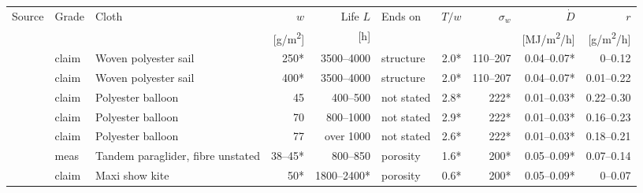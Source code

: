 \begin{tabular}{@{}lllrrlrrrr@{}}
\toprule
Source & Grade & Cloth & $w$ & Life $L$ & Ends on & $T/w$ & $\sigma_w$ & $\dot D$ & $r$ \\
 & & & [g/m\textsuperscript{2}] & [h] & & & & [MJ/m\textsuperscript{2}/h] & [g/m\textsuperscript{2}/h] \\
\midrule
\citet{flynn2015} & claim & Woven polyester sail & 250* & 3500--4000 & structure & 2.0* & 110--207 & 0.04--0.07* & 0--0.12 \\
\citet{flynn2015} & claim & Woven polyester sail & 400* & 3500--4000 & structure & 2.0* & 110--207 & 0.04--0.07* & 0.01--0.22 \\
\citet{kubicek2026} & claim & Polyester balloon & 45 & 400--500 & not stated & 2.8* & 222* & 0.01--0.03* & 0.22--0.30 \\
\citet{kubicek2026} & claim & Polyester balloon & 70 & 800--1000 & not stated & 2.9* & 222* & 0.01--0.03* & 0.16--0.23 \\
\citet{kubicek2026} & claim & Polyester balloon & 77 & over 1000 & not stated & 2.6* & 222* & 0.01--0.03* & 0.18--0.21 \\
\citet{supair2016} & meas & Tandem paraglider, fibre unstated & 38--45* & 800--850 & porosity & 1.6* & 200* & 0.05--0.09* & 0.07--0.14 \\
\citet{lynn2007} & claim & Maxi show kite & 50* & 1800--2400* & porosity & 0.6* & 200* & 0.05--0.09* & 0--0.07 \\
\bottomrule
\end{tabular}
